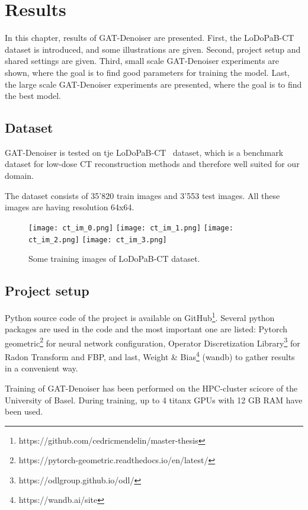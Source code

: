\chapter{Results}
\label{sec:results}

In this chapter, results of GAT-Denoiser are presented.
First, the LoDoPaB-CT dataset is introduced, and some illustrations are given.
Second, project setup and shared settings are given.
Third, small scale GAT-Denoiser experiments are shown, where the goal is to find
good parameters for training the model.
Last, the large scale GAT-Denoiser experiments are presented, where the goal is 
to find the best model.



\section{Dataset}
GAT-Denoiser is tested on tje LoDoPaB-CT~\cite{lodopab-dataset} dataset, which is a 
benchmark dataset for low-dose CT reconstruction methods and therefore well suited for our domain.

The dataset consists of 35'820 train images and 3'553 test images.
All these images are having resolution 64x64.

\begin{figure}[H]
  \centering
  \hfill
  \texttt{[image: ct\_im\_0.png]}
  \hfill
  \texttt{[image: ct\_im\_1.png]}
  \hfill
  \texttt{[image: ct\_im\_2.png]}
  \hfill
  \texttt{[image: ct\_im\_3.png]}
  \hfill
  \caption{Some training images of LoDoPaB-CT dataset.}
\end{figure}



\section{Project setup}
Python source code of the project is available on GitHub\footnote{https://github.com/cedricmendelin/master-thesis}.
Several python packages are used in the code and the most important one are listed: Pytorch geometric\footnote{https://pytorch-geometric.readthedocs.io/en/latest/} 
for neural network configuration, Operator Discretization Library\footnote{https://odlgroup.github.io/odl/} for Radon Transform and FBP, 
and last, Weight \& Bias\footnote{https://wandb.ai/site} (wandb) to gather results in a convenient way.

Training of GAT-Denoiser has been performed on the HPC-cluster scicore of the University of Basel.
During training, up to 4 titanx GPUs with 12 GB RAM have been used.


